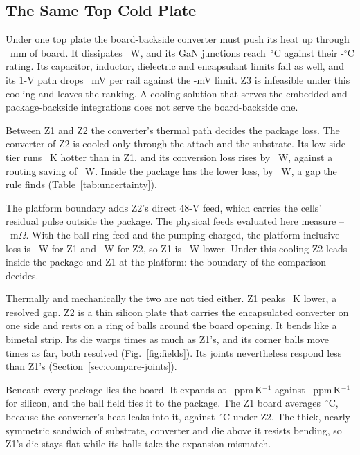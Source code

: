 \subsection{The Same Top Cold Plate}\label{sec:compare-a}
Under one top plate the board-backside converter must push its heat up through \FrBoardMm~mm of
board. It dissipates \PlossAZthree~W, and its GaN junctions reach \TjAZthree\,$^\circ$C against their
\MthLimGan-$^\circ$C rating. Its capacitor, inductor, dielectric and encapsulant limits fail as well,
and its 1-V path drops \VdropAZthree~mV per rail against the \MthLimDrop-mV limit. Z3 is infeasible
under this cooling and leaves the ranking. A cooling solution that serves the embedded and
package-backside integrations does not serve the board-backside one.

Between Z1 and Z2 the converter's thermal path decides the package loss. The converter of Z2 is
cooled only through the attach and the substrate. Its low-side tier runs \WrdTlsAZtwo~K hotter than
in Z1, and its conversion loss rises by \WrdPconvAZtwo~W, against a routing saving of
\WrdProuteAZtwo~W. Inside the package \WrLowA{} has the lower loss, by \GapAZtwo~W, a gap the rule
finds \WrResAZoneZtwoPloss{} (Table~\ref{tab:uncertainty}).

The platform boundary adds Z2's direct 48-V feed, which carries the cells' residual pulse outside
the package. \WrRstarSentA{} The physical feeds evaluated here measure
\FeedRflexZtwo--\FeedRbgaZtwo~m$\Omega$. With the ball-ring feed and the pumping charged, the
platform-inclusive loss is \PlatAZone~W for Z1 and \PlatAZtwo~W for Z2, so Z1 is \WrPlatGapA~W
lower. Under this cooling Z2 leads inside the package and Z1 at the platform: the boundary of the
comparison decides.

Thermally and mechanically the two are not tied either. Z1 peaks \WrdTmaxAZtwo~K lower, a resolved
gap. Z2 is a thin silicon plate that carries the encapsulated converter on one side and rests on a
ring of balls around the board opening. It bends like a bimetal strip. Its die warps
\WrWarpRatioAZtwo{} times as much as Z1's, and its corner balls move \WrDuRatioAZtwo{} times as far,
both resolved (Fig.~\ref{fig:fields}). Its joints nevertheless respond less than Z1's
(Section~\ref{sec:compare-joints}).

Beneath every package lies the board. It expands at \CteBoard~ppm\,K$^{-1}$ against
\CteSi~ppm\,K$^{-1}$ for silicon, and the ball field ties it to the package. The Z1 board averages
\TboardAZone\,$^\circ$C, because the converter's heat leaks into it, against \TboardAZtwo\,$^\circ$C
under Z2. The thick, nearly symmetric sandwich of substrate, converter and die above it resists
bending, so Z1's die stays flat while its balls take the expansion mismatch.

